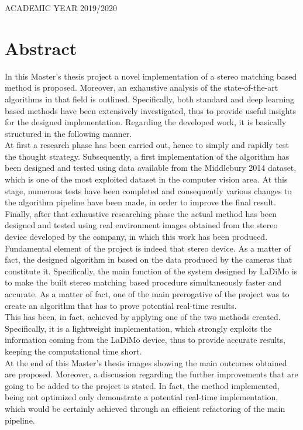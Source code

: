 \documentclass[12pt,a4paper,oneside,pdftex]{report}
\begin{document}
\vfill
\begin{center}
    ACADEMIC YEAR 2019/2020
\end{center}

\chapter*{Abstract}
In this Master's thesis project a novel implementation of a stereo matching based method is proposed.
Moreover, an exhaustive analysis of the state-of-the-art algorithms in that field is outlined.
Specifically, both standard and deep learning based methods have been extensively investigated, thus to provide useful insights for the designed implementation.
Regarding the developed work, it is basically structured in the following manner.\\
At first a research phase has been carried out, hence to simply and rapidly test the thought strategy.
Subsequently, a first implementation of the algorithm has been designed and tested using data available from the Middlebury 2014 dataset, which is one of the most exploited dataset in the computer vision area.
At this stage, numerous tests have been completed and consequently various changes to the algorithm pipeline have been made, in order to improve the final result.\\
Finally, after that exhaustive researching phase the actual method has been designed and tested using real environment images obtained from the stereo device developed by the company, in which this work has been produced.\\
Fundamental element of the project is indeed that stereo device.
As a matter of fact, the designed algorithm in based on the data produced by the cameras that constitute it.
Specifically, the main function of the system designed by LaDiMo is to make the built stereo matching based procedure simultaneously faster and accurate.
As a matter of fact, one of the main prerogative of the project was to create an algorithm that has to prove potential real-time results.\\
This has been, in fact, achieved by applying one of the two methods created.
Specifically, it is a lightweight implementation, which strongly exploits the information coming from the LaDiMo device, thus to provide accurate results, keeping the computational time short.\\
At the end of this Master's thesis images showing the main outcomes obtained are proposed.
Moreover, a discussion regarding the further improvements that are going to be added to the project is stated.
In fact, the method implemented, being not optimized only demonstrate a potential real-time implementation, which would be certainly achieved through an efficient refactoring of the main pipeline.
\restoregeometry
\end{document}

